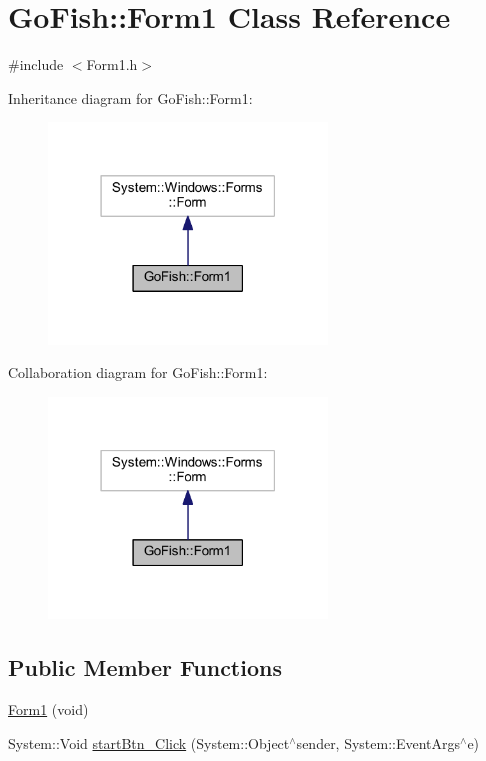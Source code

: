 \hypertarget{class_go_fish_1_1_form1}{\section{Go\+Fish\+:\+:Form1 Class Reference}
\label{class_go_fish_1_1_form1}
}


{\ttfamily \#include $<$Form1.\+h$>$}



Inheritance diagram for Go\+Fish\+:\+:Form1\+:\nopagebreak
\begin{figure}[H]
\begin{center}
\leavevmode
\includegraphics[width=210pt]{class_go_fish_1_1_form1__inherit__graph}
\end{center}
\end{figure}


Collaboration diagram for Go\+Fish\+:\+:Form1\+:\nopagebreak
\begin{figure}[H]
\begin{center}
\leavevmode
\includegraphics[width=210pt]{class_go_fish_1_1_form1__coll__graph}
\end{center}
\end{figure}
\subsection*{Public Member Functions}
\begin{DoxyCompactItemize}
\item 
\hyperlink{class_go_fish_1_1_form1_a0ce9b0237d4a230cba08fbfa74bb2b02}{Form1} (void)
\item 
System\+::\+Void \hyperlink{class_go_fish_1_1_form1_a31dd106b83b5bf65028eac54f8164368}{start\+Btn\+\_\+\+Click} (System\+::\+Object$^\wedge$sender, System\+::\+Event\+Args$^\wedge$e)
\end{DoxyCompactItemize}
